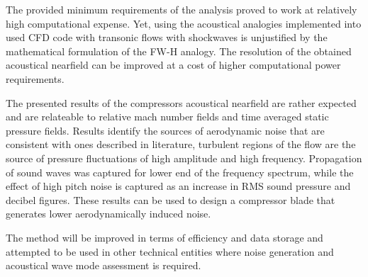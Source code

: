 The provided minimum requirements of the analysis proved to work at relatively high computational expense. Yet, using the acoustical analogies implemented into used CFD code with transonic flows with shockwaves is unjustified by the mathematical formulation of the FW-H analogy. The resolution of the obtained acoustical nearfield can be improved at a cost of higher computational power requirements.

The presented results of the compressors acoustical nearfield are rather expected and are relateable to relative mach number fields and time averaged static pressure fields. Results identify the sources of aerodynamic noise that are consistent with ones described in literature, turbulent regions of the flow are the source of pressure fluctuations of high amplitude and high frequency. Propagation of sound waves was captured for lower end of the frequency spectrum, while the effect of high pitch noise is captured as an increase in RMS sound pressure and decibel figures. These results can be used to design a compressor blade that generates lower aerodynamically induced noise.

The method will be improved in terms of efficiency and data storage and attempted to be used in other technical entities where noise generation and acoustical wave mode assessment is required.